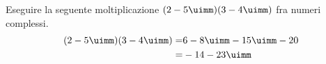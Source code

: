 Eseguire la seguente moltiplicazione $(2-5\uimm)(3-4\uimm)$ fra numeri complessi.
\begin{align*}
(2-5\uimm)(3-4\uimm)=&6-8\uimm-15\uimm-20\\
=&-14-23\uimm
\end{align*}
 
